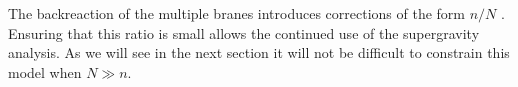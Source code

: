 


The backreaction of the multiple branes introduces corrections of the form $n/N$
\cite{hltw}. Ensuring that this ratio is small allows the continued use of the
supergravity analysis. As we will see in the next section it will not be
difficult to constrain this model when $N\gg n$.


